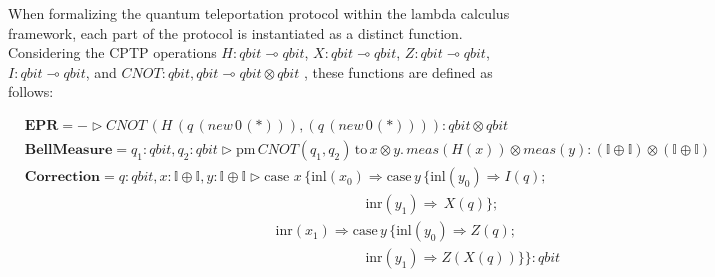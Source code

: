 \documentclass[10pt,a4paper]{amsart}
\theoremstyle{definition}
\theoremstyle{definition}
\theoremstyle{definition}
\theoremstyle{definition}
\theoremstyle{definition}
\theoremstyle{definition}
\begin{document}
When formalizing the quantum teleportation protocol within the lambda calculus framework, each part of the protocol is instantiated as a distinct function. 
Considering the CPTP operations $H: \textit{qbit} \multimap  \textit{qbit}$, $X: \textit{qbit} \multimap  \textit{qbit}$, $Z: \textit{qbit} \multimap  \textit{qbit}$, $I: \textit{qbit} \multimap  \textit{qbit}$, and $\textit{CNOT}: \textit{qbit}, \textit{qbit} \multimap  \textit{qbit} \otimes \textit{qbit}$ , these functions are defined as follows:

\begin{align*}
   &\textbf{EPR} =  - \triangleright  \textit{CNOT} \hspace{2pt} (\textit{H}\hspace{2pt} (q  \hspace{2pt}    ( \textit{new}   \hspace{2pt}  0 \hspace{1pt}(*))),(q  \hspace{2pt}   ( \textit{new}   \hspace{2pt}  0 \hspace{1pt}(*)))) : \textit{qbit} \otimes \textit{qbit}  \\ 
      &\textbf{BellMeasure} =  q_{1}: \textit{qbit}, q_{2}: \textit{qbit}  \triangleright  \text{pm}  \hspace{2pt} \textit{CNOT} (q_{1},q_{2})  \hspace{2pt}  \text{to} \hspace{2pt} x \otimes y.  \hspace{2pt}  \textit{meas} (\textit{H} (x)) \otimes \textit{meas} (y) : \left(\mathbb{I} \oplus \mathbb{I}\right) \otimes \left(\mathbb{I} \oplus \mathbb{I}\right) \\
      &\textbf{Correction}= q: \textit{qbit}, x: \mathbb{I} \oplus \mathbb{I},  y: \mathbb{I} \oplus \mathbb{I} \triangleright  \text{case } x  \hspace{2pt}  \{\text{inl} (x_{0}) \Rightarrow  \text{case}\hspace{2pt} y  \hspace{2pt}  \{\text{inl} (y_{0})  \Rightarrow{}  \textit{I}(q); \\
      & \hspace{292pt} \text{inr} (y_{1}) \Rightarrow  \hspace{2pt}   \textit{X} (q)\} ; \\
      & \hspace{215pt}\text{inr} (x_{1})  \Rightarrow  \text{case}\hspace{2pt} y  \hspace{2pt}  \{\text{inl} (y_{0})  \Rightarrow   \textit{Z}(q);  \\
      &\hspace{292pt} \text{inr} (y_{1}) \Rightarrow{} \textit{Z} (\textit{X}(q)) \}\} : \textit{qbit}
 \end{align*}
\end{document}
